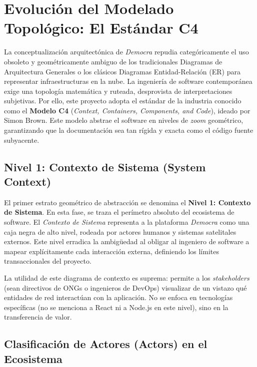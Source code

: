 \section{Evoluci\'on del Modelado Topol\'ogico: El Est\'andar C4}

La conceptualizaci\'on arquitect\'onica de \textit{Democra} repudia categ\'oricamente el uso obsoleto y geom\'etricamente ambiguo de los tradicionales Diagramas de Arquitectura Generales o los cl\'asicos Diagramas Entidad-Relaci\'on (ER) para representar infraestructuras en la nube. La ingenier\'ia de software contempor\'anea exige una topolog\'ia matem\'atica y ruteada, desprovista de interpretaciones subjetivas. Por ello, este proyecto adopta el est\'andar de la industria conocido como el \textbf{Modelo C4} (\textit{Context, Containers, Components, and Code}), ideado por Simon Brown. Este modelo abstrae el software en niveles de \textit{zoom} geom\'etrico, garantizando que la documentaci\'on sea tan r\'igida y exacta como el c\'odigo fuente subyacente.

\subsection{Nivel 1: Contexto de Sistema (System Context)}

El primer estrato geom\'etrico de abstracci\'on se denomina el \textbf{Nivel 1: Contexto de Sistema}. En esta fase, se traza el per\'imetro absoluto del ecosistema de software. El \textit{Contexto de Sistema} representa a la plataforma \textit{Democra} como una caja negra de alto nivel, rodeada por actores humanos y sistemas satelitales externos. Este nivel erradica la ambig\"uedad al obligar al ingeniero de software a mapear expl\'icitamente cada interacci\'on externa, definiendo los l\'imites transaccionales del proyecto.

La utilidad de este diagrama de contexto es suprema: permite a los \textit{stakeholders} (sean directivos de ONGs o ingenieros de DevOps) visualizar de un vistazo qu\'e entidades de red interact\'uan con la aplicaci\'on. No se enfoca en tecnolog\'ias espec\'ificas (no se menciona a React ni a Node.js en este nivel), sino en la transferencia de valor.

\subsection{Clasificaci\'on de Actores (Actors) en el Ecosistema}

